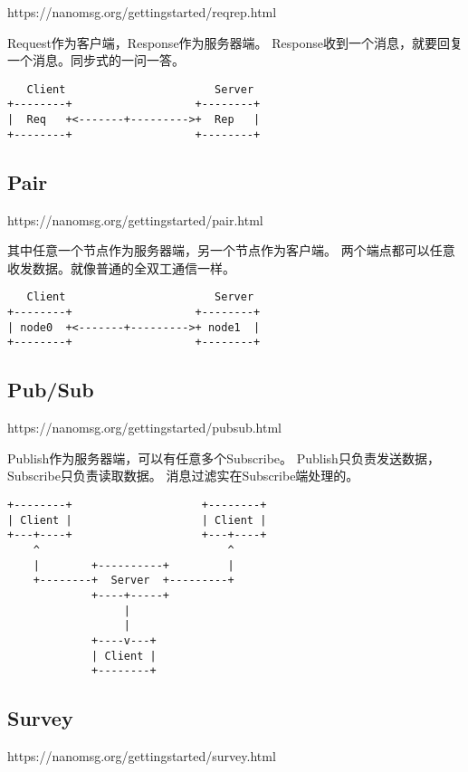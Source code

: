 https://nanomsg.org/gettingstarted/reqrep.html

Request作为客户端，Response作为服务器端。
Response收到一个消息，就要回复一个消息。同步式的一问一答。

\begin{verbatim}
   Client                       Server
+--------+                   +--------+
|  Req   +<-------+--------->+  Rep   |
+--------+                   +--------+
\end{verbatim}

\subsection{Pair}

https://nanomsg.org/gettingstarted/pair.html

其中任意一个节点作为服务器端，另一个节点作为客户端。
两个端点都可以任意收发数据。就像普通的全双工通信一样。

\begin{verbatim}
   Client                       Server
+--------+                   +--------+
| node0  +<-------+--------->+ node1  |
+--------+                   +--------+
\end{verbatim}

\subsection{Pub/Sub}

https://nanomsg.org/gettingstarted/pubsub.html

Publish作为服务器端，可以有任意多个Subscribe。
Publish只负责发送数据，Subscribe只负责读取数据。
消息过滤实在Subscribe端处理的。

\begin{verbatim}
+--------+                    +--------+
| Client |                    | Client |
+---+----+                    +---+----+
    ^                             ^
    |        +----------+         |
    +--------+  Server  +---------+
             +----+-----+
                  |
                  |
             +----v---+
             | Client |
             +--------+
\end{verbatim}

\subsection{Survey}

https://nanomsg.org/gettingstarted/survey.html

